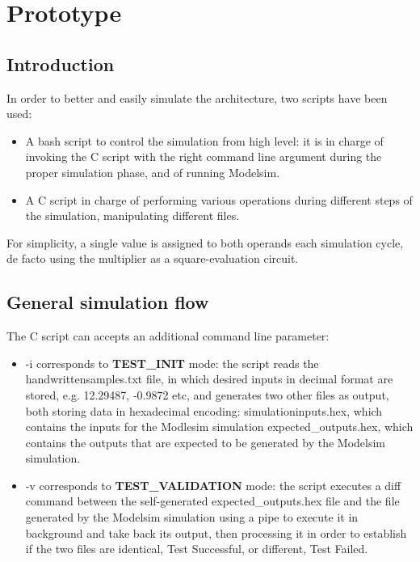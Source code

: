 %
\chapter{Prototype}
\label{chap1}
\graphicspath{ {./chapters/chap1images/} }
\section{Introduction}
In order to better and easily simulate the architecture, two scripts have been used:\begin{itemize}
    \item A bash script to control the simulation from high level: it is in charge of invoking the C script with the right command line argument during the proper simulation phase, and of 
    running Modelsim.
    \item A C script in charge of performing various operations during different steps of the simulation, manipulating different files.
    \end{itemize} 
For simplicity, a single value is assigned to both operands each simulation cycle, de facto using the multiplier as a square-evaluation circuit.
\section{General simulation flow}
The C script can accepts an additional command line parameter:\begin{itemize}
    \item -i corresponds to \textbf{TEST\_INIT} mode: the script reads the handwrittensamples.txt file, in which desired inputs in decimal format are stored, e.g. 12.29487, -0.9872 etc, 
    and generates two other files as output, both storing data in hexadecimal encoding:
    simulationinputs.hex, which contains the inputs for the Modlesim simulation
    expected\_outputs.hex, which contains the outputs that are expected to be generated by the Modelsim simulation.
    \item -v corresponds to \textbf{TEST\_VALIDATION} mode: the script executes a diff command between the self-generated expected\_outputs.hex file and the file generated by the Modelsim simulation using 
    a pipe to execute it in background and take back its output, then processing it in order to establish if the two files are identical, Test Successful, or different, Test Failed.
    
    \end{itemize} 


